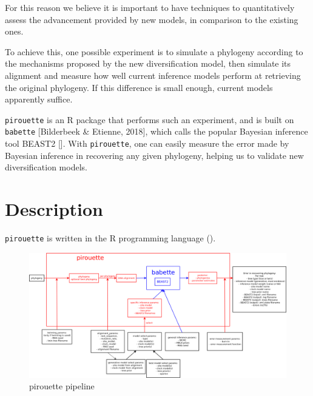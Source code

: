 \documentclass{article}
\begin{document}
For this reason we believe it is important to have techniques to quantitatively assess the advancement provided by new models, in comparison to the existing ones.

To achieve this, one possible experiment
is to simulate a phylogeny according to the mechanisms proposed by the new diversification model, then simulate its alignment and measure how well current inference models perform at retrieving the original phylogeny.
If this difference is small enough, current models apparently
suffice.

\verb;pirouette; is an R package that performs such an experiment,
and is built on \verb;babette; [Bilderbeek \& Etienne, 2018], 
which calls the popular Bayesian inference tool 
BEAST2 [\cite{bouckaert2014beast}]. With \verb;pirouette;, one
can easily measure the error made by Bayesian inference in recovering
any given phylogeny, helping us to validate new diversification models.

\section{Description}

\verb;pirouette; is written in the R programming language (\cite{R}).

\begin{figure}
  \centering
  \includegraphics[width=\textwidth]{overview.png}
  \caption{pirouette pipeline}
  \label{fig:pipeline}
\end{figure}
\end{document}
